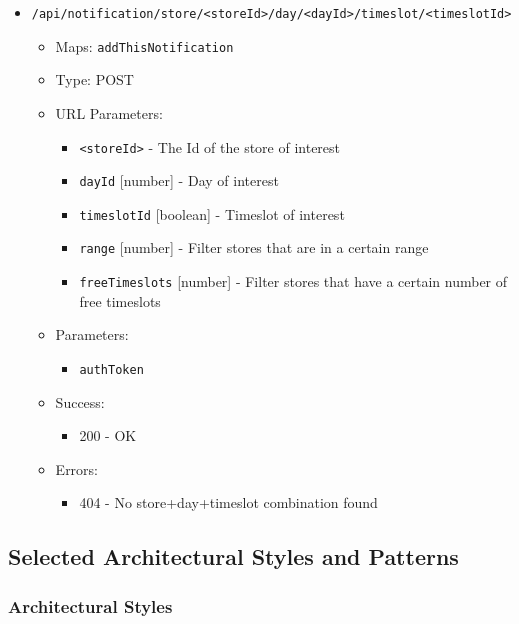 \begin{itemize}
    \item \texttt{/api/notification/store/<storeId>/day/<dayId>/timeslot/<timeslotId>}
    \begin{itemize}
        \item Maps: \texttt{addThisNotification}
        \item Type: POST
        \item URL Parameters:
        \begin{itemize}
            \item \texttt{<storeId>} - The Id of the store of interest
            \item \texttt{dayId} [number] - Day of interest
            \item \texttt{timeslotId} [boolean] - Timeslot of interest
            \item \texttt{range} [number] - Filter stores that are in a certain range
            \item \texttt{freeTimeslots} [number] - Filter stores that have a certain number of free timeslots
        \end{itemize}
        \item Parameters:
        \begin{itemize}
            \item \texttt{authToken}
        \end{itemize} 
        \item Success:
        \begin{itemize}
            \item 200 - OK
        \end{itemize}
        \item Errors:
        \begin{itemize}
            \item 404 - No store+day+timeslot combination found
        \end{itemize}
    \end{itemize}
\end{itemize}

\subsection{Selected Architectural Styles and Patterns}
\subsubsection{Architectural Styles}
